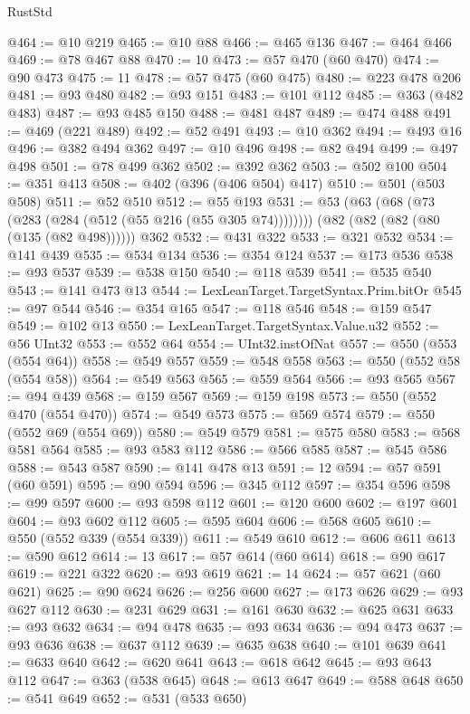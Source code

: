 \begin{lexlean}{RustStd}
\begin{coremodule}
@464 := @10 @219
@465 := @10 @88
@466 := @465 @136
@467 := @464 @466
@469 := @78 @467 @88
@470 := 10
@473 := @57 @470 (@60 @470)
@474 := @90 @473
@475 := 11
@478 := @57 @475 (@60 @475)
@480 := @223 @478 @206
@481 := @93 @480
@482 := @93 @151
@483 := @101 @112
@485 := @363 (@482 @483)
@487 := @93 @485 @150
@488 := @481 @487
@489 := @474 @488
@491 := @469 (@221 @489)
@492 := @52 @491
@493 := @10 @362
@494 := @493 @16
@496 := @382 @494 @362
@497 := @10 @496
@498 := @82 @494
@499 := @497 @498
@501 := @78 @499 @362
@502 := @392 @362
@503 := @502 @100
@504 := @351 @413
@508 := @402 (@396 (@406 @504) @417)
@510 := @501 (@503 @508)
@511 := @52 @510
@512 := @55 @193
@531 := @53
    (@63 (@68 (@73 (@283 (@284 (@512 (@55 @216 (@55 @305 @74))))))))
    (@82 (@82 (@82 (@80 (@135 (@82 @498))))))
    @362
@532 := @431 @322
@533 := @321 @532
@534 := @141 @439
@535 := @534 @134
@536 := @354 @124
@537 := @173 @536
@538 := @93 @537
@539 := @538 @150
@540 := @118 @539
@541 := @535 @540
@543 := @141 @473 @13
@544 := LexLeanTarget.TargetSyntax.Prim.bitOr
@545 := @97 @544
@546 := @354 @165
@547 := @118 @546
@548 := @159 @547
@549 := @102 @13
@550 := LexLeanTarget.TargetSyntax.Value.u32
@552 := @56 UInt32
@553 := @552 @64
@554 := UInt32.instOfNat
@557 := @550 (@553 (@554 @64))
@558 := @549 @557
@559 := @548 @558
@563 := @550 (@552 @58 (@554 @58))
@564 := @549 @563
@565 := @559 @564
@566 := @93 @565
@567 := @94 @439
@568 := @159 @567
@569 := @159 @198
@573 := @550 (@552 @470 (@554 @470))
@574 := @549 @573
@575 := @569 @574
@579 := @550 (@552 @69 (@554 @69))
@580 := @549 @579
@581 := @575 @580
@583 := @568 @581 @564
@585 := @93 @583 @112
@586 := @566 @585
@587 := @545 @586
@588 := @543 @587
@590 := @141 @478 @13
@591 := 12
@594 := @57 @591 (@60 @591)
@595 := @90 @594
@596 := @345 @112
@597 := @354 @596
@598 := @99 @597
@600 := @93 @598 @112
@601 := @120 @600
@602 := @197 @601
@604 := @93 @602 @112
@605 := @595 @604
@606 := @568 @605
@610 := @550 (@552 @339 (@554 @339))
@611 := @549 @610
@612 := @606 @611
@613 := @590 @612
@614 := 13
@617 := @57 @614 (@60 @614)
@618 := @90 @617
@619 := @221 @322
@620 := @93 @619
@621 := 14
@624 := @57 @621 (@60 @621)
@625 := @90 @624
@626 := @256 @600
@627 := @173 @626
@629 := @93 @627 @112
@630 := @231 @629
@631 := @161 @630
@632 := @625 @631
@633 := @93 @632
@634 := @94 @478
@635 := @93 @634
@636 := @94 @473
@637 := @93 @636
@638 := @637 @112
@639 := @635 @638
@640 := @101 @639
@641 := @633 @640
@642 := @620 @641
@643 := @618 @642
@645 := @93 @643 @112
@647 := @363 (@538 @645)
@648 := @613 @647
@649 := @588 @648
@650 := @541 @649
@652 := @531 (@533 @650)

\end{coremodule}
\end{lexlean}
